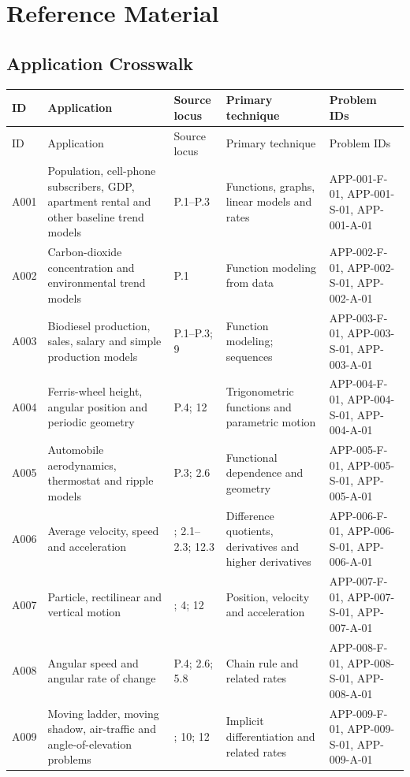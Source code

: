 \documentclass[11pt]{book}
\begin{document}
\part{Reference Material}
\chapter{Application Crosswalk}
\small\begin{longtable}{@{}>{\raggedright\arraybackslash}p{}>{\raggedright\arraybackslash}p{}>{\raggedright\arraybackslash}p{}>{\raggedright\arraybackslash}p{}>{\raggedright\arraybackslash}p{}@{}}\toprule
ID & Application & Source locus & Primary technique & Problem IDs \\\midrule\endfirsthead\toprule ID & Application & Source locus & Primary technique & Problem IDs \\\midrule\endhead
A001 & Population, cell-phone subscribers, GDP, apartment rental and other baseline trend models & P.1–P.3 & Functions, graphs, linear models and rates & APP-001-F-01, APP-001-S-01, APP-001-A-01  \\
A002 & Carbon-dioxide concentration and environmental trend models & P.1 & Function modeling from data & APP-002-F-01, APP-002-S-01, APP-002-A-01  \\
A003 & Biodiesel production, sales, salary and simple production models & P.1–P.3; 9 & Function modeling; sequences & APP-003-F-01, APP-003-S-01, APP-003-A-01  \\
A004 & Ferris-wheel height, angular position and periodic geometry & P.4; 12 & Trigonometric functions and parametric motion & APP-004-F-01, APP-004-S-01, APP-004-A-01  \\
A005 & Automobile aerodynamics, thermostat and ripple models & P.3; 2.6 & Functional dependence and geometry & APP-005-F-01, APP-005-S-01, APP-005-A-01  \\
A006 & Average velocity, speed and acceleration & 1; 2.1–2.3; 12.3 & Difference quotients, derivatives and higher derivatives & APP-006-F-01, APP-006-S-01, APP-006-A-01  \\
A007 & Particle, rectilinear and vertical motion & 2; 4; 12 & Position, velocity and acceleration & APP-007-F-01, APP-007-S-01, APP-007-A-01  \\
A008 & Angular speed and angular rate of change & P.4; 2.6; 5.8 & Chain rule and related rates & APP-008-F-01, APP-008-S-01, APP-008-A-01  \\
A009 & Moving ladder, moving shadow, air-traffic and angle-of-elevation problems & 2.6; 10; 12 & Implicit differentiation and related rates & APP-009-F-01, APP-009-S-01, APP-009-A-01  \\

\end{longtable}
\end{document}
